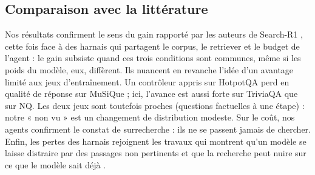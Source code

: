\subsection{Comparaison avec la littérature}
Nos résultats confirment le sens du gain rapporté par les auteurs de Search-R1 \citep{jin2025search}, cette fois face à des harnais qui partagent le corpus, le retriever et le budget de l'agent : le gain subsiste quand ces trois conditions sont communes, même si les poids du modèle, eux, diffèrent. Ils nuancent en revanche l'idée d'un avantage limité aux jeux d'entraînement. Un contrôleur appris sur HotpotQA perd en qualité de réponse sur MuSiQue \citep{raikote2026policy} ; ici, l'avance est aussi forte sur TriviaQA que sur NQ. Les deux jeux sont toutefois proches (questions factuelles à une étape) : notre « non vu » est un changement de distribution modeste. Sur le coût, nos agents confirment le constat de surrecherche \citep{wu2025search,tang2026saas} : ils ne se passent jamais de chercher. Enfin, les pertes des harnais rejoignent les travaux qui montrent qu'un modèle se laisse distraire par des passages non pertinents \citep{yoran2023making} et que la recherche peut nuire sur ce que le modèle sait déjà \citep{mallen2022when,maekawa2024retrieval}.

